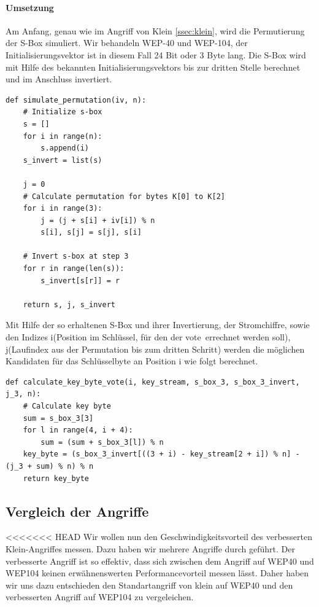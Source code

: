 \documentclass[10pt,a4paper]{article}
\begin{document}
\paragraph{Umsetzung}
Am Anfang, genau wie im Angriff von Klein \ref{ssec:klein}, wird die Permutierung der S-Box simuliert. Wir behandeln WEP-40 und WEP-104, der Initialisierungsvektor ist in diesem Fall 24 Bit oder 3 Byte lang. Die S-Box wird mit Hilfe des bekannten Initialisierungsvektors bis zur dritten Stelle berechnet und im Anschluss invertiert.
\begin{lstlisting}
def simulate_permutation(iv, n):
    # Initialize s-box
    s = []
    for i in range(n):
        s.append(i)
    s_invert = list(s)

    j = 0
    # Calculate permutation for bytes K[0] to K[2]
    for i in range(3):
        j = (j + s[i] + iv[i]) % n
        s[i], s[j] = s[j], s[i]

    # Invert s-box at step 3
    for r in range(len(s)):
        s_invert[s[r]] = r

    return s, j, s_invert
\end{lstlisting}
Mit Hilfe der so erhaltenen S-Box und ihrer Invertierung, der Stromchiffre, sowie den Indizes i(Position im Schlüssel, für den der \glqq vote\grqq\ errechnet werden soll), j(Laufindex aus der Permutation bis zum dritten Schritt) werden die möglichen Kandidaten für das Schlüsselbyte an Position i wie folgt berechnet.
\begin{lstlisting}
def calculate_key_byte_vote(i, key_stream, s_box_3, s_box_3_invert, j_3, n):
    # Calculate key byte
    sum = s_box_3[3]
    for l in range(4, i + 4):
        sum = (sum + s_box_3[l]) % n
    key_byte = (s_box_3_invert[((3 + i) - key_stream[2 + i]) % n] - (j_3 + sum) % n) % n
    return key_byte
\end{lstlisting}

\subsection{Vergleich der Angriffe}
<<<<<<< HEAD
\label{subsec:vergleich}
Wir wollen nun den Geschwindigkeitsvorteil des verbesserten Klein-Angriffes messen. Dazu haben wir mehrere Angriffe durch geführt. Der verbesserte Angriff ist so effektiv, dass sich zwischen dem Angriff auf WEP40 und WEP104 keinen erwähnenswerten Performancevorteil messen lässt. Daher haben wir uns dazu entschieden den Standartangriff von klein auf WEP40 und den verbesserten Angriff auf WEP104 zu vergeleichen.
\end{document}
